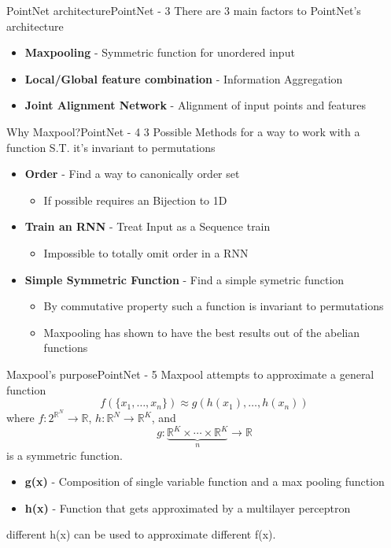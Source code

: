 \documentclass{beamer}
\begin{document}
		\begin{frame}{PointNet architecture}{PointNet - 3}
			There are 3 main factors to PointNet's architecture
			\begin{itemize}
				\item \textbf{Maxpooling} - Symmetric function for unordered input
				\item \textbf{Local/Global feature combination} - Information Aggregation
				\item \textbf{Joint Alignment Network} - Alignment of input points and features
			\end{itemize}
		\end{frame}
		
		\begin{frame}{Why Maxpool?}{PointNet - 4}
			3 Possible Methods for a way to work with a function S.T. it's invariant to permutations
			\begin{itemize}
				\item \textbf{Order} - Find a way to canonically order set
				\begin{itemize}
					\item If possible requires an Bijection to 1D
				\end{itemize}
				\item \textbf{Train an RNN} - Treat Input as a Sequence train
				\begin{itemize}
					\item Impossible to totally omit order in a RNN
				\end{itemize}
				\item \textbf{Simple Symmetric Function} - Find a simple symetric function
				\begin{itemize}
					\item By commutative property such a function is invariant to permutations
					\item Maxpooling has shown to have the best results out of the abelian functions
				\end{itemize}
			\end{itemize}
		\end{frame}
	
		\begin{frame}{Maxpool's purpose}{PointNet - 5}\small
            Maxpool attempts to approximate a general function \[f(\{x_1, \ldots, x_n\}) \approx g(h(x_1), \ldots, h(x_n))\]
            where \( f : 2^{\mathbb{R}^N} \to \mathbb{R} \), \( h : \mathbb{R}^N \to \mathbb{R}^K \), and  \[
                g : \underbrace{\mathbb{R}^K \times \cdots \times \mathbb{R}^K}_{n} 
                \to \mathbb{R}
            \]
            is a symmetric function.
            
			\begin{itemize}\normalsize
				\item \textbf{g(x)} - Composition of single variable function and a max pooling function
                \item \textbf{h(x)} - Function that gets approximated by a multilayer perceptron
			\end{itemize}
            different h(x) can be used to approximate different f(x).
		\end{frame}
\end{document}
